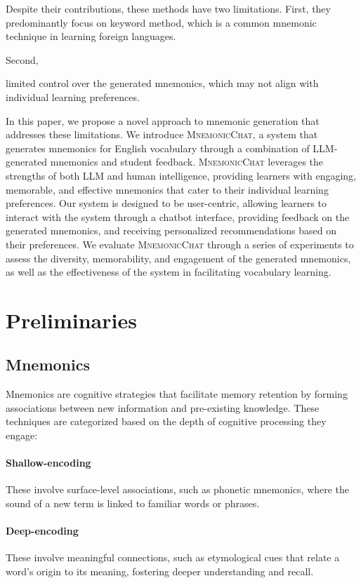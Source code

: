 \documentclass[11pt, onecolumn]{article}
\newcounter{para}
\begin{document}
Despite their contributions, these methods have two limitations. First, they predominantly focus on keyword method, which is a common mnemonic technique in learning foreign languages.

Second,

limited control over the generated mnemonics, which may not align with individual learning preferences.

In this paper, we propose a novel approach to mnemonic generation that addresses these limitations. We introduce \textsc{MnemonicChat}, a system that generates mnemonics for English vocabulary through a combination of LLM-generated mnemonics and student feedback. \textsc{MnemonicChat} leverages the strengths of both LLM and human intelligence, providing learners with engaging, memorable, and effective mnemonics that cater to their individual learning preferences. Our system is designed to be user-centric, allowing learners to interact with the system through a chatbot interface, providing feedback on the generated mnemonics, and receiving personalized recommendations based on their preferences. We evaluate \textsc{MnemonicChat} through a series of experiments to assess the diversity, memorability, and engagement of the generated mnemonics, as well as the effectiveness of the system in facilitating vocabulary learning.
\section{Preliminaries}

\subsection{Mnemonics}

Mnemonics are cognitive strategies that facilitate memory retention by forming associations between new information and pre-existing knowledge. These techniques are categorized based on the depth of cognitive processing they engage:

\paragraph{Shallow-encoding} These involve surface-level associations, such as phonetic mnemonics, where the sound of a new term is linked to familiar words or phrases.
\paragraph{Deep-encoding} These involve meaningful connections, such as etymological cues that relate a word's origin to its meaning, fostering deeper understanding and recall.
\end{document}
